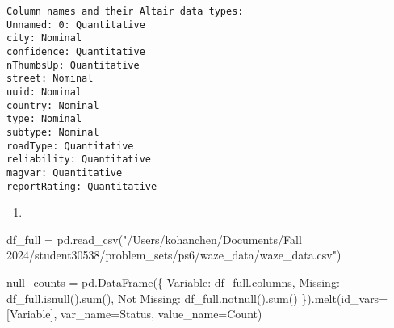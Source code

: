 \documentclass[
  letterpaper,
  DIV=11,
  numbers=noendperiod]{scrartcl}
\newenvironment{Shaded}{\begin{snugshade}}{\end{snugshade}}
\newcommand{\BuiltInTok}[1]{\textcolor[rgb]{0.00,0.23,0.31}{#1}}
\newcommand{\NormalTok}[1]{\textcolor[rgb]{0.00,0.23,0.31}{#1}}
\newcommand{\OperatorTok}[1]{\textcolor[rgb]{0.37,0.37,0.37}{#1}}
\newcommand{\StringTok}[1]{\textcolor[rgb]{0.13,0.47,0.30}{#1}}
\providecommand{\tightlist}{%
  \setlength{\itemsep}{0pt}\setlength{\parskip}{0pt}}\usepackage{longtable,booktabs,array}
\begin{document}
\begin{verbatim}
Column names and their Altair data types:
Unnamed: 0: Quantitative
city: Nominal
confidence: Quantitative
nThumbsUp: Quantitative
street: Nominal
uuid: Nominal
country: Nominal
type: Nominal
subtype: Nominal
roadType: Quantitative
reliability: Quantitative
magvar: Quantitative
reportRating: Quantitative
\end{verbatim}

\begin{enumerate}
\def\labelenumi{\arabic{enumi}.}
\setcounter{enumi}{1}
\tightlist
\item
\end{enumerate}

\begin{Shaded}
\begin{Highlighting}[]
\NormalTok{df\_full }\OperatorTok{=}\NormalTok{ pd.read\_csv(}\StringTok{"/Users/kohanchen/Documents/Fall 2024/student30538/problem\_sets/ps6/waze\_data/waze\_data.csv"}\NormalTok{)}

\NormalTok{null\_counts }\OperatorTok{=}\NormalTok{ pd.DataFrame(\{}
    \StringTok{\textquotesingle{}Variable\textquotesingle{}}\NormalTok{: df\_full.columns,}
    \StringTok{\textquotesingle{}Missing\textquotesingle{}}\NormalTok{: df\_full.isnull().}\BuiltInTok{sum}\NormalTok{(),}
    \StringTok{\textquotesingle{}Not Missing\textquotesingle{}}\NormalTok{: df\_full.notnull().}\BuiltInTok{sum}\NormalTok{()}
\NormalTok{\}).melt(id\_vars}\OperatorTok{=}\NormalTok{[}\StringTok{\textquotesingle{}Variable\textquotesingle{}}\NormalTok{], var\_name}\OperatorTok{=}\StringTok{\textquotesingle{}Status\textquotesingle{}}\NormalTok{, value\_name}\OperatorTok{=}\StringTok{\textquotesingle{}Count\textquotesingle{}}\NormalTok{)}


\end{Highlighting}
\end{Shaded}
\end{document}
